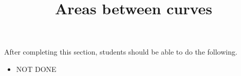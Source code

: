 \documentclass{ximera}
\title{Areas between curves}
\begin{document}
\begin{abstract}
\end{abstract}

\maketitle

\begin{sectionOutcomes}

After completing this section, students should be able to do the following.

\begin{itemize}
\item NOT DONE
\end{itemize}

\end{sectionOutcomes}
\end{document}
